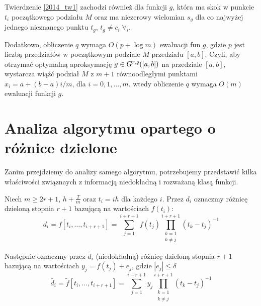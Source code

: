 \documentclass[oik, pdftex, robocza, man]{mgrwms}
\begin{document}
    \begin{uw}
        Twierdzenie \eqref{2014_tw1} zachodzi również dla funkcji $g$, która ma skok w punkcie $t_{i}$ początkowego podziału $M$ oraz ma niezerowy wielomian $s_{g}$ dla co najwyżej jednego nieznanego punktu $t_{g}$, $t_{g} \neq c_{i} \; \forall_{i}$.
    \end{uw}

    Dodatkowo, obliczenie $q$ wymaga $O(p+\log m)$ ewaluacji fun $g$, gdzie $p$ jest liczbą przedziałów w początkowym podziale $M$ przedziału $[a,b]$. Czyli, aby otrzymać optymalną aproksymację $g \in G^{r,\varrho}([a,b])$ na przedziale $[a,b]$, wystarcza wiąźć podział $M$ z $m+1$ równoodległymi punktami $x_{i} = a+(b-a)i/m$, dla $i=0,1,\dots,m$. wtedy obliczenie $q$ wymaga $O(m)$ ewaluacji funkcji $g$.


\section{Analiza algorytmu opartego o różnice dzielone}


    Zanim przejdziemy do analizy samego algorytmu, potrzebujemy przedstawić kilka właściwości związnaych z informacją niedokładną i rozważaną klasą funkcji.

    Niech $m \geq 2r + 1$, $h + \frac{T}{m}$ oraz $t_{i} = ih$ dla każdego $i$. Przez $d_{i}$ oznaczmy różnicę dzieloną stopnia $r+1$ bazującą na wartościach $f(t_{i})$:
    \begin{equation*}
        d_{i} = f[t_{i}, \dots, t_{i+r+1}] = \sum_{j = 1}^{i+r+1} f(t_{j}) \prod_{\substack{k=1 \\ k \neq j}}^{i+r+1}(t_{k}-t_{j})^{-1}
    \end{equation*}

    Następnie oznaczmy przez $\tilde{d_i}$ (niedokładną) różnicę dzieloną stopnia $r+1$ bazującą na wartościach $y_{j} = f(t_{j}) + e_{j}$, gdzie $|e_{j}| \leq \delta$
    \begin{equation*}
        \tilde{d_{i}} = \tilde{f}[t_{i}, \dots, t_{i+r+1}] = \sum_{j = 1}^{i+r+1} y_{j} \prod_{\substack{k=1 \\ k \neq j}}^{i+r+1}(t_{k}-t_{j})^{-1}
    \end{equation*}
\end{document}
